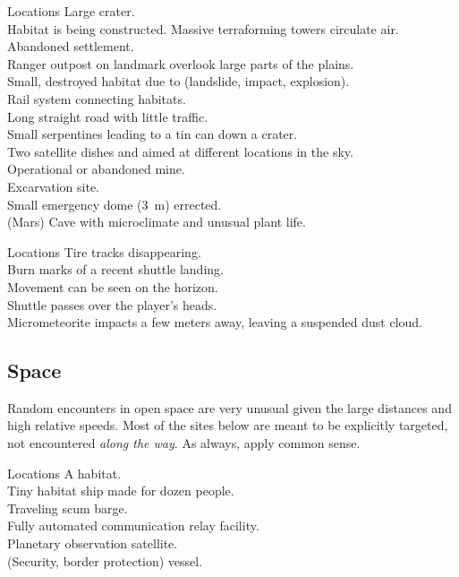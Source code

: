 \documentclass[a4]{book}
\begin{document}
\begin{tableone}{Locations}
Large crater.\\
Habitat is being constructed.
Massive terraforming towers circulate air.\\
Abandoned settlement.\\
Ranger outpost on landmark overlook large parts of the plains.\\
Small, destroyed habitat due to (landslide, impact, explosion).\\
Rail system connecting habitats.\\
Long straight road with little traffic.\\
Small serpentines leading to a tin can down a crater.\\
Two satellite dishes and aimed at different locations in the sky.\\
Operational or abandoned mine.\\
Excarvation site.\\
Small emergency dome (\SI{3}{\m}) errected.\\
(Mars) Cave with microclimate and unusual plant life.\\
\end{tableone}


\begin{tableone}{Locations}
Tire tracks disappearing.\\
Burn marks of a recent shuttle landing.\\
Movement can be seen on the horizon.\\
Shuttle passes over the player's heads.\\
Micrometeorite impacts a few meters away, leaving a suspended dust cloud.\\
\end{tableone}



\subsection*{Space}

Random encounters in open space are very unusual given the large distances and high relative speeds.
Most of the sites below are meant to be explicitly targeted, not encountered \textit{along the way}.
As always, apply common sense.

\begin{tableone}{Locations}
A habitat.\\
Tiny habitat ship made for dozen people.\\
Traveling scum barge.\\
Fully automated communication relay facility.\\
Planetary observation satellite.\\
(Security, border protection) vessel.\\
\end{tableone}
\end{document}
